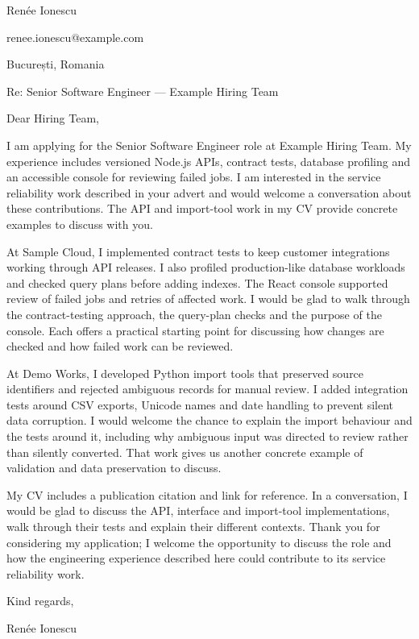 \documentclass[11pt,a4paper]{article}
\begin{document}
Renée Ionescu\par

renee.ionescu@example.com\par

București, Romania\par

Re: Senior Software Engineer — Example Hiring Team\par

Dear Hiring Team,\par

I am applying for the Senior Software Engineer role at Example Hiring Team. My experience includes versioned Node.js APIs, contract tests, database profiling and an accessible console for reviewing failed jobs. I am interested in the service reliability work described in your advert and would welcome a conversation about these contributions. The API and import-tool work in my CV provide concrete examples to discuss with you.\par

At Sample Cloud, I implemented contract tests to keep customer integrations working through API releases. I also profiled production-like database workloads and checked query plans before adding indexes. The React console supported review of failed jobs and retries of affected work. I would be glad to walk through the contract-testing approach, the query-plan checks and the purpose of the console. Each offers a practical starting point for discussing how changes are checked and how failed work can be reviewed.\par

At Demo Works, I developed Python import tools that preserved source identifiers and rejected ambiguous records for manual review. I added integration tests around CSV exports, Unicode names and date handling to prevent silent data corruption. I would welcome the chance to explain the import behaviour and the tests around it, including why ambiguous input was directed to review rather than silently converted. That work gives us another concrete example of validation and data preservation to discuss.\par

My CV includes a publication citation and link for reference. In a conversation, I would be glad to discuss the API, interface and import-tool implementations, walk through their tests and explain their different contexts. Thank you for considering my application; I welcome the opportunity to discuss the role and how the engineering experience described here could contribute to its service reliability work.\par

Kind regards,\par

Renée Ionescu
\par
\end{document}
